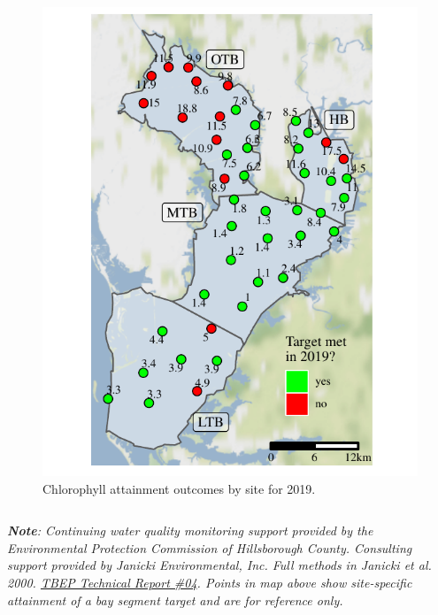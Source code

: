 \documentclass[final,t]{beamer}\usepackage[]{graphicx}\usepackage[]{color}
\begin{document}
\begin{frame}
\begin{columns}[t]
\begin{column}{.79\linewidth}
\begin{columns}[t]
\begin{column}{0.37\textwidth}
\begin{figure}
\centerline{\includegraphics[trim = 0cm 0cm 0cm -1.25cm, width=1.1\linewidth]{figure/sitemap.pdf}}
\caption{\footnotesize Chlorophyll attainment outcomes by site for 2019.}
\label{fig:sitemap}
\end{figure}

\end{column}

\end{columns}

\vspace{-0.4cm}

\tiny \textit{\textbf{Note}: Continuing water quality monitoring support provided by the Environmental Protection Commission of Hillsborough County.  Consulting support provided by Janicki Environmental, Inc.  Full methods in Janicki et al. 2000. \href{https://www.tbeptech.org/TBEP_TECH_PUBS/2000/TBEP_04_00Chlor-A.pdf}{TBEP Technical Report \#04}. Points in map above show site-specific attainment of a bay segment target and are for reference only.} \\

\end{column}

\end{columns}

\end{frame}
\end{document}
